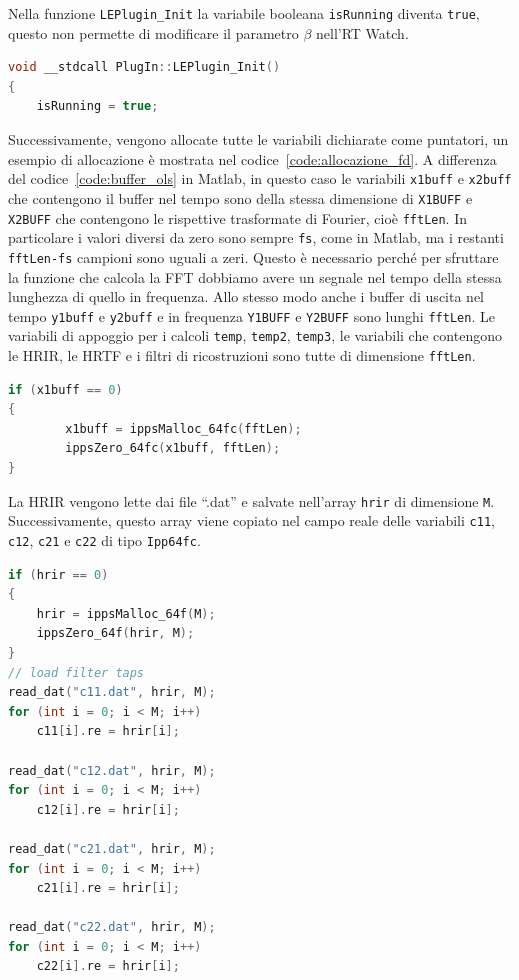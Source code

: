 \documentclass[12pt,a4paper,titlepage]{article}
\begin{document}
Nella funzione \texttt{LEPlugin\_Init} la variabile booleana \texttt{isRunning} diventa \texttt{true}, questo non permette di modificare il parametro $\beta$ nell'RT Watch.

\begin{lstlisting}[language=cpp, label=code:isRunning_init, caption = Variabile \texttt{isRunning} nella funzione \texttt{LEPlugin\_Init}, breaklines = false, captionpos = b]
void __stdcall PlugIn::LEPlugin_Init()
{
	isRunning = true;
\end{lstlisting}

Successivamente, vengono allocate tutte le variabili dichiarate come puntatori, un esempio di allocazione è mostrata nel codice~\ref{code:allocazione_fd}. A differenza del codice~\ref{code:buffer_ols} in Matlab, in questo caso le variabili \texttt{x1buff} e \texttt{x2buff} che contengono il buffer nel tempo sono della stessa dimensione di \texttt{X1BUFF} e \texttt{X2BUFF} che contengono le rispettive trasformate di Fourier, cioè \texttt{fftLen}. In particolare i valori diversi da zero sono sempre \texttt{fs}, come in Matlab, ma i restanti \texttt{fftLen-fs} campioni sono uguali a zeri. Questo è necessario perché per sfruttare la funzione che calcola la FFT dobbiamo avere un segnale nel tempo della stessa lunghezza di quello in frequenza. Allo stesso modo anche i buffer di uscita nel tempo \texttt{y1buff} e \texttt{y2buff} e in frequenza \texttt{Y1BUFF} e \texttt{Y2BUFF} sono lunghi \texttt{fftLen}. Le variabili di appoggio per i calcoli \texttt{temp}, \texttt{temp2}, \texttt{temp3}, le variabili che contengono le HRIR, le HRTF e i filtri di ricostruzioni sono tutte di dimensione	 \texttt{fftLen}.

\begin{lstlisting}[language=cpp, label=code:allocazione_fd, caption = Allocazione della variabile \texttt{x1buff} nella funzione \texttt{LEPlugin\_Init}, breaklines = false, captionpos = b]
if (x1buff == 0)
{
		x1buff = ippsMalloc_64fc(fftLen);
		ippsZero_64fc(x1buff, fftLen);
}
\end{lstlisting}

La HRIR vengono lette dai file ``.dat'' e salvate nell'array \texttt{hrir} di dimensione \texttt{M}. Successivamente, questo array viene copiato nel campo reale delle variabili \texttt{c11}, \texttt{c12}, \texttt{c21} e \texttt{c22} di tipo \texttt{Ipp64fc}.

\begin{lstlisting}[language=cpp, label=code:lettura_hrir, caption = Lettura delle HRIR, breaklines = false, captionpos = b]
if (hrir == 0)
{
	hrir = ippsMalloc_64f(M);
	ippsZero_64f(hrir, M);
}
// load filter taps
read_dat("c11.dat", hrir, M);
for (int i = 0; i < M; i++)
	c11[i].re = hrir[i];

read_dat("c12.dat", hrir, M);
for (int i = 0; i < M; i++)
	c12[i].re = hrir[i];

read_dat("c21.dat", hrir, M);
for (int i = 0; i < M; i++)
	c21[i].re = hrir[i];

read_dat("c22.dat", hrir, M);
for (int i = 0; i < M; i++)
	c22[i].re = hrir[i];
\end{lstlisting}
	
\end{document}

